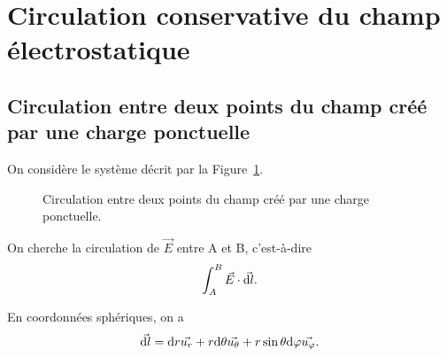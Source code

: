 \section[Circulation du champ électrostatique]{Circulation conservative du champ électrostatique}

    \subsection{Circulation entre deux points du champ créé par une charge ponctuelle}

        On considère le système décrit par la Figure~\ref{fig:circulation_deux_points_champ_cree_charge_ponctuelle}.

        \begin{figure}
            \centering
            \caption{Circulation entre deux points du champ créé par une charge ponctuelle.}    
            \label{fig:circulation_deux_points_champ_cree_charge_ponctuelle}
        \end{figure}
        
        On cherche la circulation de $\vec{E}$ entre A et B, c'est-à-dire 
        \begin{equation}
            \int_{A}^{B}\vec{E}\cdot\vec{\mathrm{d} l}.
        \end{equation}

        En coordonnées sphériques, on a
        \begin{equation}
            \vec{\mathrm{d} l}=\mathrm{d} r\vec{u_r}+r\mathrm{d}\theta\vec{u_{\theta}}+r\sin\theta\mathrm{d}\varphi\vec{u_{\varphi}}.
        \end{equation}

